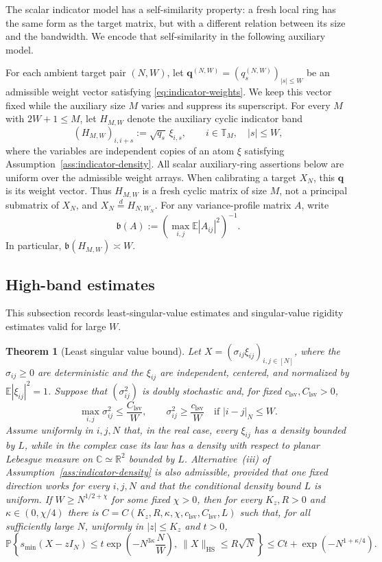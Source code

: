 \documentclass[11pt,reqno]{amsart}
\numberwithin{equation}{section}
\newtheorem{theorem}{Theorem}[section]
\theoremstyle{definition}
\theoremstyle{remark}
\newcommand{\C}{\mathbb C}
\newcommand{\R}{\mathbb R}
\newcommand{\T}{\mathbb T}
\newcommand{\E}{\mathbb E}
\newcommand{\Pp}{\mathbb P}
\newcommand{\1}{\mathbf 1}
\newcommand{\HS}{\mathrm{HS}}
\begin{document}
The scalar indicator model has a self-similarity property: a fresh local
ring has the same form as the target matrix, but with a different
relation between its size and the bandwidth.  We encode that
self-similarity in the following auxiliary model.


For each ambient target pair $(N,W)$, let
$\mathbf q^{(N,W)}=(q_s^{(N,W)})_{|s|\le W}$ be an admissible weight
vector satisfying \eqref{eq:indicator-weights}.  We keep this vector fixed
while the auxiliary size $M$ varies and suppress its superscript.
For every $M$ with $2W+1\le M$, let $H_{M,W}$ denote the auxiliary cyclic indicator band
\begin{equation}\label{eq:auxiliary-ring}
 (H_{M,W})_{i,i+s}:=\sqrt{q_s}\,\xi_{i,s},
 \qquad i\in\T_M,\quad |s|\le W,
\end{equation}
where the variables are independent copies of an atom $\xi$ satisfying
Assumption~\ref{ass:indicator-density}.  All scalar auxiliary-ring
assertions below are uniform over the admissible weight arrays.  When
calibrating a target $X_N$, this
$\mathbf q$ is its weight vector.  Thus $H_{M,W}$ is a fresh cyclic matrix
of size $M$, not a principal submatrix of $X_N$, and
$X_N\stackrel{d}=H_{N,W_N}$.  For any variance-profile
matrix $A$, write
\[
 \mathfrak b(A):=\left(\max_{i,j}\E|A_{ij}|^2\right)^{-1}.
\]
In particular, $\mathfrak b(H_{M,W})\asymp W$.

\subsection{High-band estimates}
This subsection records least-singular-value estimates and singular-value
rigidity estimates valid for large $W$.
\begin{theorem}[Least singular value bound]
\label{thm:high-band-lsv}
Let $X=(\sigma_{ij}\xi_{ij})_{i,j\in[N]}$, where the $\sigma_{ij}\ge0$ are
deterministic and the $\xi_{ij}$ are independent, centered, and normalized
by $\E|\xi_{ij}|^2=1$.  Suppose that $(\sigma_{ij}^2)$ is doubly stochastic and, for fixed
$c_{\mathrm{lsv}},C_{\mathrm{lsv}}>0$,
\[
 \max_{i,j}\sigma_{ij}^2\le \frac{C_{\mathrm{lsv}}}{W},\qquad
 \sigma_{ij}^2\ge \frac{c_{\mathrm{lsv}}}{W}
 \quad\text{if }|i-j|_N\le W.
\]
Assume uniformly in $i,j,N$ that, in the real case, every $\xi_{ij}$ has
a density bounded by $L$, while in the complex case its law has a density
with respect to planar Lebesgue measure on $\C\simeq\R^2$ bounded by $L$.
Alternative~\textnormal{(iii)} of
Assumption~\ref{ass:indicator-density} is also admissible, provided that
one fixed direction works for every
$i,j,N$ and that the conditional density bound $L$ is uniform.  If
$W\ge N^{1/2+\chi}$ for some fixed $\chi>0$, then for every $K_z,R>0$ and
$\kappa\in(0,\chi/4)$ there is
$C=C(K_z,R,\kappa,\chi,c_{\mathrm{lsv}},C_{\mathrm{lsv}},L)$ such that,
for all sufficiently large $N$,
uniformly in $|z|\le K_z$ and $t>0$,
\[
 \Pp\left\{s_{\min}(X-zI_N)
 \le t\exp\left(-N^{3\kappa}\frac NW\right),\ 
 \|X\|_{\HS}\le R\sqrt N\right\}
 \le Ct+\exp(-N^{1+\kappa/4}).
\]
\end{theorem}
\end{document}
